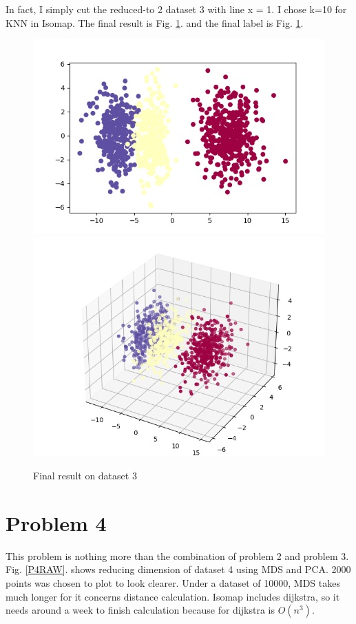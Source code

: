 \documentclass[conference]{IEEEtran}
\begin{document}
In fact, I simply cut the reduced-to 2 dataset 3 with line x = 1. I chose k=10 for KNN in Isomap. The final result is Fig. \ref{P3FIN}. and the final label is Fig. \ref{P3FIN}.

\begin{figure}[htbp]
	\includegraphics[scale=0.28]{P3Fin.png}
	\includegraphics[scale=0.28]{P3Fin3.png}
	\caption{Final result on dataset 3}
	\label{P3FIN}
\end{figure}

\section{\textbf{Problem 4}}
This problem is nothing more than the combination of problem 2 and problem 3. Fig. \ref{P4RAW}. shows reducing dimension of dataset 4 using MDS and PCA. 2000 points was chosen to plot to look clearer. Under a dataset of 10000, MDS takes much longer for it concerns distance calculation. Isomap includes dijkstra, so it needs around a week to finish calculation because for dijkstra is $O(n^3)$.
\end{document}
